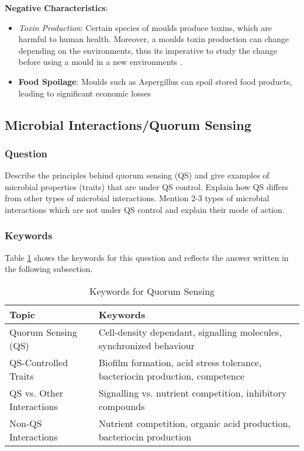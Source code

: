 \vspace{0.5em}  
\textbf{Negative Characteristics}:
\begin{itemize}
    \item \textit{Toxin Production}: Certain species of moulds produce toxins, which are harmful to human health. Moreover, a moulds toxin production can change depending on the environments, thus its imperative to study the change before using a mould in a new environments \cite*{LS03}.
    \item \textbf{Food Spoilage}: Moulds such as Aspergillus can spoil stored food products, leading to significant economic losses \cite*{L1-DiversityMicro}
\end{itemize}

\subsection{Microbial Interactions/Quorum Sensing}
\subsubsection*{Question}
Describe the principles behind quorum sensing (QS) and give examples of microbial properties (traits) that are under QS control. Explain how QS differs from other types of microbial interactions. Mention 2-3 types of microbial interactions which are not under QS control and explain their mode of action.  

\subsubsection*{Keywords}
Table \ref{tab:KW-Quorum} shows the keywords for this question and reflects the answer written in the following subsection.
\begin{table}[h]
    \centering
    \caption{Keywords for Quorum Sensing} 
    \label{tab:KW-Quorum}
    \begin{tabular}{l|l}
        \textbf{Topic} & \textbf{Keywords} \\
        \hline
        Quorum Sensing (QS) & Cell-density dependant, signalling molecules, synchronized behaviour \\

        QS-Controlled Traits & Biofilm formation, acid stress tolerance, bacteriocin production, competence \\

        QS vs. Other Interactions & Signalling vs. nutrient competition, inhibitory compounds \\

        Non-QS Interactions & Nutrient competition, organic acid production, bacteriocin production \\
    \end{tabular}
\end{table}

